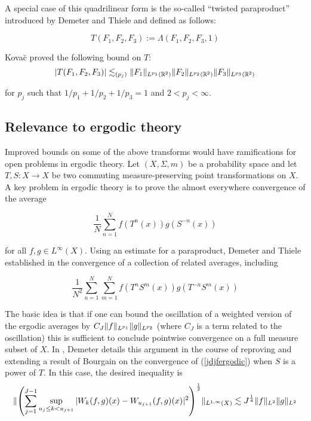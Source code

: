 \documentclass[12pt]{article}
\DeclarePairedDelimiter\norm{\lVert}{\rVert}
\begin{document}
A special case of this quadrilinear form is the so-called ``twisted paraproduct'' introduced by Demeter and Thiele and defined as follows:

\begin{equation}\label{jdjfparaproduct}
T(F_1, F_2, F_3):= \Lambda(F_1, F_2, F_3, 1)
\end{equation}

\noindent Kova\u{c} \cite{kjdjf} proved the following bound on $T$:
\begin{equation}\label{jdjfparaproductbound}
\vert T(F_1, F_2, F_3) \vert \lesssim_{(p_j)} \norm{F_1}_{L^{p_1}(\mathbb{R}^2)}\norm{F_2}_{L^{p_2}(\mathbb{R}^2)}\norm{F_3}_{L^{p_3}(\mathbb{R}^2)}
\end{equation}

\noindent for $p_j$ such that $1/p_1 + 1/p_2 + 1/p_3 = 1$ and $2<p_j<\infty$.  
\subsection{Relevance to ergodic theory}

Improved bounds on some of the above transforms would have ramifications for open problems in ergodic theory. Let $(X, \Sigma, m)$ be a probability space and let $T, S: X \rightarrow X$ be two commuting measure-preserving point transformations on $X$. A key problem in ergodic theory is to prove the almost everywhere convergence of the average

\begin{equation}\label{jdjfergodic}
\dfrac{1}{N}\sum\limits_{n=1}^{N}f(T^n(x))g(S^{-n}(x))
\end{equation}

\noindent for all $f, g\in L^\infty(X)$. Using an estimate for a paraproduct, Demeter and Thiele established in \cite{dtjdjf} the convergence of a collection of related averages, including

\begin{equation}\label{jdjfergodic2}
\dfrac{1}{N^2}\sum\limits_{n=1}^{N}\sum\limits_{m=1}^{N}f(T^nS^m(x))g(T^{-n}S^m(x))
\end{equation}

The basic idea is that if one can bound the oscillation of a weighted version of the ergodic averages by $C_J \norm{f}_{L^{p_1}} \norm{g}_{L^{p_2}}$ (where $C_J$ is a term related to the oscillation) this is sufficient to conclude pointwise convergence on a full measure subset of $X$. In \cite{dejdjf}, Demeter details this argument in the course of reproving and extending a result of Bourgain on the convergence of (\ref{jdjfergodic}) when $S$ is a power of $T$. In this case, the desired inequality is
\begin{equation*}
\norm{\left(\sum\limits_{j=1}^{J-1}\sup_{ u_j\leq k<u_{j+1}}\vert W_k(f, g)(x) - W_{u_{j+1}}(f, g)(x)\vert^2\right)^{\frac{1}{2}}}_{L^{1, \infty}(X)}\lesssim J^{\frac{1}{4}}\norm{f}_{L^{2}} \norm{g}_{L^{2}}
\end{equation*}
\end{document}

